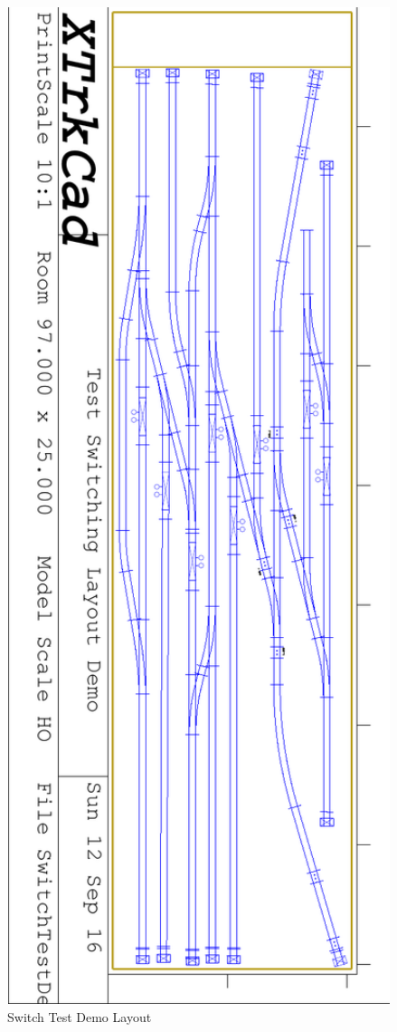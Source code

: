 \begin{figure}[hbpt] 
\begin{centering}
\includegraphics[angle=90,width=5in]{SwitchTestDemo.pdf}
\caption{Switch Test Demo Layout} 
\label{fig:TheLayout:SwitchTestDemo}
\end{centering} 
\end{figure}
